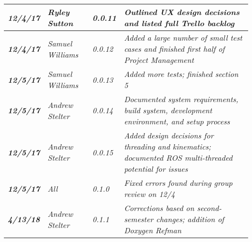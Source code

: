 \begin{tabular}{|>{\raggedright}p{1.5cm}|>{\raggedright}p{3cm}|>{\raggedright}p{1.5cm}|>{\raggedright}p{9cm}|}
\hline
\textit{\textbf{12/4/17}} & \textit{Ryley Sutton} & \textit{0.0.11} & \textit{Outlined UX design decisions and listed full Trello backlog}\tabularnewline
\hline
\textit{\textbf{12/4/17}} & \textit{Samuel Williams} & \textit{0.0.12} & \textit{Added a large number of small test cases and finished first half of Project Management}\tabularnewline
\hline
\textit{\textbf{12/5/17}} & \textit{Samuel Williams} & \textit{0.0.13} & \textit{Added more tests; finished section 5}\tabularnewline
\hline
\textit{\textbf{12/5/17}} & \textit{Andrew Stelter} & \textit{0.0.14} & \textit{Documented system requirements, build system, development environment, and setup process}\tabularnewline
\hline
\textit{\textbf{12/5/17}} & \textit{Andrew Stelter} & \textit{0.0.15} & \textit{Added design decisions for threading and kinematics; documented ROS multi-threaded potential for issues}\tabularnewline
\hline
\textit{\textbf{12/5/17}} & \textit{All} & \textit{0.1.0} & \textit{Fixed errors found during group review on 12/4}\tabularnewline
\hline
\textit{\textbf{4/13/18}} & \textit{Andrew Stelter} & \textit{0.1.1} & \textit{Corrections based on second-semester changes; addition of Doxygen Refman}\tabularnewline
\hline
\end{tabular}
\vfill

